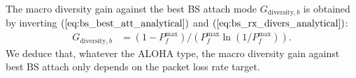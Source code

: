 The macro diversity gain against the best BS attach mode $G_{\text{diversity},b}$ is obtained by inverting $(\ref{eq:bs_best_att_analytical})$ and $(\ref{eq:bs_rx_divers_analytical})$:
\begin{align}
	\label{eq:macro-diversity-gain}
	G_{\text{diversity},b} &= \left(1-P_{f}^{\text{max}}\right)/ \left( P_{f}^{\text{max}} \ln(1/P_{f}^{\text{max}}) \right) .
\end{align}
We deduce that, whatever the ALOHA type, the macro diversity gain against best BS attach
only depends on the packet loss rate target.





